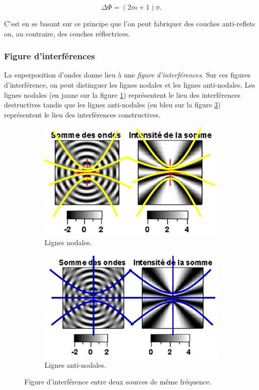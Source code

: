 $$\Delta \Phi = (2m+1)\pi.$$

C'est en se basant sur ce principe que l'on peut
fabriquer des couches anti-reflets ou, au contraire,
des couches réflectrices.

\subsubsection{Figure d'interférences}
La superposition d'ondes donne lieu à une \emph{figure
d'interférences}. Sur ces figures d'interférence, on
peut distinguer les lignes nodales et les lignes anti-nodales. 
Les lignes nodales (en jaune sur la figure \ref{fig:nodale})
représentent le lieu des interférences destructives tandis que
les lignes anti-nodales (en bleu sur la figure \ref{fig:antinodale})
représentent le lieu des interférences constructives.

\begin{figure}[ht]
	\centering
	\begin{subfigure}[b]{0.45\textwidth}
		\includegraphics[scale=0.8]{fig_interferences_nodales.png}
		\caption{Lignes nodales.}
		\label{fig:nodale}
	\end{subfigure}
	\begin{subfigure}[b]{0.45\textwidth}
		\includegraphics[scale=0.8]{fig_interferences_antinodales.png}
	\caption{Lignes anti-nodales.}	
	\label{fig:antinodale}
	\end{subfigure}
	\caption{Figure d'interférence entre deux sources de même fréquence.}
\end{figure}

